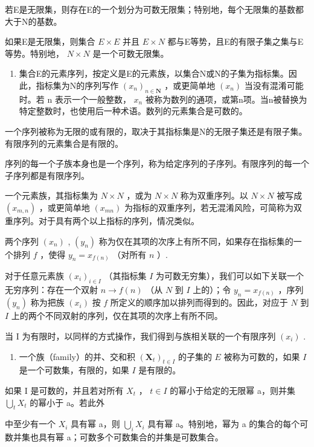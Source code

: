 若E是无限集，则存在E的一个划分为可数无限集；特别地，每个无限集的基数都大于N的基数。

如果E是无限集，则集合 \(E \times E\) 并且 \(E \times N\) 都与E等势，且E的有限子集之集与E等势。特别地， \(N \times N\) 是一个可数无限集。

\begin{enumerate}
\def\labelenumi{\arabic{enumi}.}
\setcounter{enumi}{7}
\tightlist
\item
  集合E的元素序列，按定义是E的元素族，以集合N或N的子集为指标集。因此，指标集为N的序列写作 \((x_{n})_{n\in\mathbf{N}}\) ，或更简单地 \((x_{n})\) 当没有混淆可能时。若 n 表示一个一般整数， \(x_{n}\) 被称为数列的通项，或第n项。当n被替换为特定整数时，也使用后一种术语。数列的元素集合是可数的。
\end{enumerate}

一个序列被称为无限的或有限的，取决于其指标集是N的无限子集还是有限子集。有限序列的元素集合是有限的。

序列的每一个子族本身也是一个序列，称为给定序列的子序列。有限序列的每一个子序列都是有限序列。

一个元素族，其指标集为 \(N \times N\) ，或为 \(N \times N\) 称为双重序列。以 \(N \times N\) 被写成 \((x_{m,n})\) ，或更简单地 \((x_{mn})\) 为指标的双重序列，若无混淆风险，可简称为双重序列。对于具有两个以上指标的序列，情况类似。

两个序列 \((x_{n})\) , \((y_{n})\) 称为仅在其项的次序上有所不同，如果存在指标集的一个排列 \(f\) ，使得 \(y_{n} = x_{f(n)}\) （对所有 \(n\) ）.

对于任意元素族 \((x_{i})_{i\in I}\) （其指标集 \(I\) 为可数无穷集），我们可以如下关联一个无穷序列：存在一个双射 \(n\to f(n)\) （从 \(N\) 到 \(I\) 上的）；令 \(y_{n} = x_{f(n)}\) ，序列 \((y_{n})\) 称为把族 \((x_{i})\) 按 \(f\) 所定义的顺序加以排列而得到的。因此，对应于 \(N\) 到 \(I\) 上的两个不同双射的序列，仅在其项的次序上有所不同。

当 I 为有限时，以同样的方式操作，我们得到与族相关联的一个有限序列 \((x_{i})\) .

\begin{enumerate}
\def\labelenumi{\arabic{enumi}.}
\setcounter{enumi}{8}
\tightlist
\item
  一个族（family）的并、交和积 \((\mathbf{X}_t)_{t\in I}\) 的子集的 \(E\) 被称为可数的，如果 \(I\) 是一个可数集，有限的，如果 \(I\) 是有限的。
\end{enumerate}

如果 I 是可数的，并且若对所有 \(X_{t}\) ， \(t \in I\) 的幂小于给定的无限幂 a，则并集 \(\bigcup_{t} X_{t}\) 的幂小于 a。若此外

中至少有一个 \(X_{i}\) 具有幂 a，则 \(\bigcup_{i}X_{i}\) 具有幂 a。特别地，幂为 a 的集合的每个可数并集也具有幂 a；可数多个可数集合的并集是可数集合。


